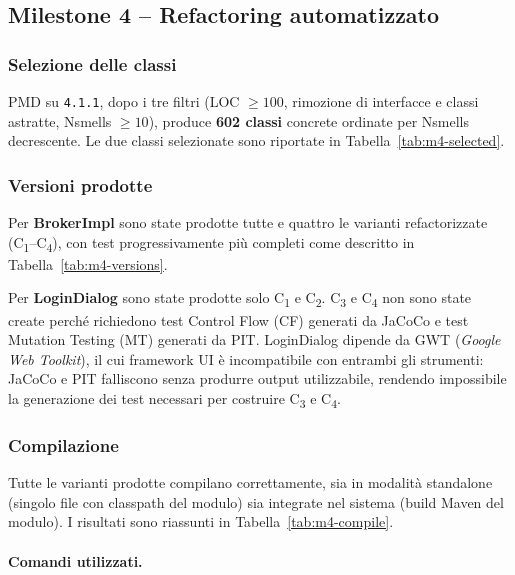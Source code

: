 \subsection{Milestone 4 -- Refactoring automatizzato}

\subsubsection{Selezione delle classi}

PMD su \texttt{4.1.1}, dopo i tre filtri (LOC $\geq 100$, rimozione di interfacce e
classi astratte, Nsmells $\geq 10$), produce \textbf{602 classi} concrete ordinate per
Nsmells decrescente. Le due classi selezionate sono
riportate in Tabella~\ref{tab:m4-selected}.

\subsubsection{Versioni prodotte}

Per \textbf{BrokerImpl} sono state prodotte tutte e quattro le varianti refactorizzate
(C\textsubscript{1}--C\textsubscript{4}), con test progressivamente più completi come
descritto in Tabella~\ref{tab:m4-versions}.

Per \textbf{LoginDialog} sono state prodotte solo C\textsubscript{1} e
C\textsubscript{2}. C\textsubscript{3} e C\textsubscript{4} non sono state create
perché richiedono test Control Flow (CF) generati da JaCoCo e test Mutation Testing
(MT) generati da PIT. LoginDialog dipende da GWT (\textit{Google Web Toolkit}), il
cui framework UI è incompatibile con entrambi gli strumenti: JaCoCo e PIT falliscono
senza produrre output utilizzabile, rendendo impossibile la generazione dei test
necessari per costruire C\textsubscript{3} e C\textsubscript{4}.

\subsubsection{Compilazione}

Tutte le varianti prodotte compilano correttamente, sia in modalità standalone
(singolo file con classpath del modulo) sia integrate nel sistema (build Maven del
modulo). I risultati sono riassunti in Tabella~\ref{tab:m4-compile}.

\paragraph{Comandi utilizzati.}

